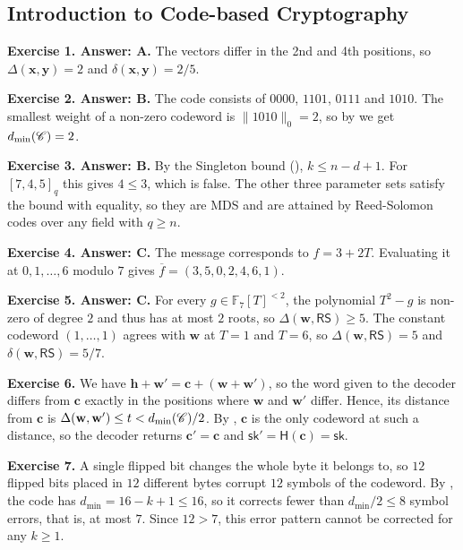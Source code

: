 \documentclass[../../book]{subfiles}
\begin{document}
\subsection*{Introduction to Code-based Cryptography}

\textbf{Exercise 1. Answer: A.} The vectors differ in the 2nd and 4th positions, so $\Delta(\mathbf{x},\mathbf{y}) = 2$ and $\delta(\mathbf{x},\mathbf{y}) = 2/5$.

\textbf{Exercise 2. Answer: B.} The code consists of $0000$, $1101$, $0111$ and $1010$. The smallest weight of a non-zero codeword is $\|1010\|_0 = 2$, so by  we get $d_{\min}(\mathscr{C}) = 2$.

\textbf{Exercise 3. Answer: B.} By the Singleton bound (), $k \leq n-d+1$. For $[7,4,5]_q$ this gives $4 \leq 3$, which is false. The other three parameter sets satisfy the bound with equality, so they are MDS and are attained by Reed-Solomon codes over any field with $q \geq n$.

\textbf{Exercise 4. Answer: C.} The message corresponds to $f = 3 + 2T$. Evaluating it at $0,1,\ldots,6$ modulo $7$ gives $\overline{f} = (3,5,0,2,4,6,1)$.

\textbf{Exercise 5. Answer: C.} For every $g \in \mathbb{F}_7[T]^{<2}$, the polynomial $T^2 - g$ is non-zero of degree $2$ and thus has at most $2$ roots, so $\Delta(\mathbf{w}, \mathsf{RS}) \geq 5$. The constant codeword $(1,\ldots,1)$ agrees with $\mathbf{w}$ at $T = 1$ and $T = 6$, so $\Delta(\mathbf{w}, \mathsf{RS}) = 5$ and $\delta(\mathbf{w}, \mathsf{RS}) = 5/7$.

\textbf{Exercise 6.} We have $\mathbf{h} + \mathbf{w}' = \mathbf{c} + (\mathbf{w} + \mathbf{w}')$, so the word given to the decoder differs from $\mathbf{c}$ exactly in the positions where $\mathbf{w}$ and $\mathbf{w}'$ differ. Hence, its distance from $\mathbf{c}$ is $\Delta(\mathbf{w}, \mathbf{w}') \leq t < d_{\min}(\mathscr{C})/2$. By , $\mathbf{c}$ is the only codeword at such a distance, so the decoder returns $\mathbf{c}' = \mathbf{c}$ and $\mathsf{sk}' = \mathsf{H}(\mathbf{c}) = \mathsf{sk}$.

\textbf{Exercise 7.} A single flipped bit changes the whole byte it belongs to, so $12$ flipped bits placed in $12$ different bytes corrupt $12$ symbols of the codeword. By , the code has $d_{\min} = 16 - k + 1 \leq 16$, so it corrects fewer than $d_{\min}/2 \leq 8$ symbol errors, that is, at most $7$. Since $12 > 7$, this error pattern cannot be corrected for any $k \geq 1$.
\end{document}
